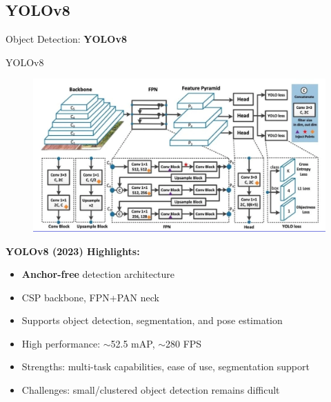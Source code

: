 \subsection{YOLOv8}
\begin{frame}{}
    \LARGE Object Detection: \textbf{YOLOv8}
\end{frame}

\begin{frame}[allowframebreaks]{YOLOv8}
    \begin{figure}
        \centering
        \includegraphics[width=1.0\textwidth,height=0.9\textheight,keepaspectratio]{images/object-detect/yolo-v8.png}
    \end{figure}
\framebreak
    \textbf{YOLOv8 (2023) Highlights:}
    \begin{itemize}
        \item \textbf{Anchor-free} detection architecture
        \item CSP backbone, FPN+PAN neck
        \item Supports object detection, segmentation, and pose estimation
        \item High performance: $\sim$52.5 mAP, $\sim$280 FPS
        \item Strengths: multi-task capabilities, ease of use, segmentation support
        \item Challenges: small/clustered object detection remains difficult
    \end{itemize}
\end{frame}